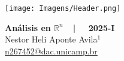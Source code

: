 \documentclass[a4paper, 11pt]{article}
\begin{document}

\-\vspace{-0.3in} 

\par\noindent \texttt{[image: Imagens/Header.png]} 


\begin{center} %
{\Large\textbf{Análisis en \(\mathbb{R}^n\)\ \ | \ \  2025-I}} \vspace{0.1in}   \\ {\small
Nestor Heli Aponte Avila\(^1\) \\ 
\href{mailto:n267452@dac.unicamp.br}{\url{n267452@dac.unicamp.br}}} %

\end{center} %


\theoremstyle{definition}
\newtheorem*{definition}{}

\theoremstyle{plain}
\newtheorem*{lemma}{{\scriptsize \(\square\)}}
\newtheorem*{proposition}{{\large \(\square\)}}
\newtheorem*{theorem}{{\large \(\blacksquare\)}} 

\makeatletter
\def\@thm@headpunct{} %

\def\th@plain{%
  \thm@headpunct{} %
}

\def\th@definition{%
  \thm@headpunct{} %
}

\def\th@remark{%
  \thm@headpunct{} %
}
\makeatother
\end{document}
